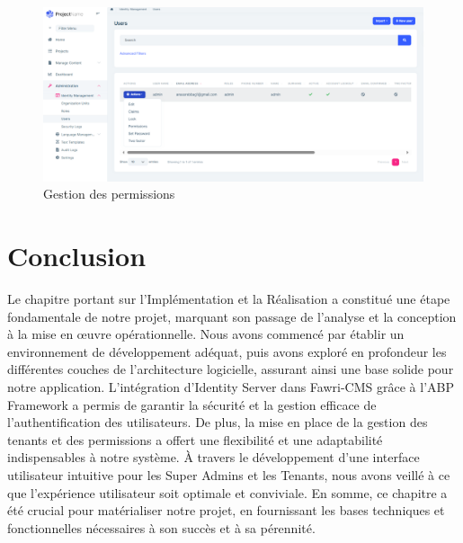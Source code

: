 \begin{enumerate}
          \begin{figure}[H]
              \centering
              \includegraphics[width=17cm]{Figures/permission.PNG}
              \caption{Gestion des permissions}
          \end{figure}





\end{enumerate}



















\newpage

\section*{Conclusion}

\hspace{\parindent}Le chapitre portant sur l'Implémentation et la Réalisation a constitué une étape fondamentale de notre projet, marquant son passage de l’analyse et la conception à la mise en œuvre opérationnelle. Nous avons commencé par établir un environnement de développement adéquat, puis avons exploré en profondeur les différentes couches de l'architecture logicielle, assurant ainsi une base solide pour notre application. L'intégration d'Identity Server dans Fawri-CMS grâce à l'ABP Framework a permis de garantir la sécurité et la gestion efficace de l'authentification des utilisateurs. De plus, la mise en place de la gestion des tenants et des permissions a offert une flexibilité et une adaptabilité indispensables à notre système. À travers le développement d'une interface utilisateur intuitive pour les Super Admins et les Tenants, nous avons veillé à ce que l'expérience utilisateur soit optimale et conviviale. En somme, ce chapitre a été crucial pour matérialiser notre projet, en fournissant les bases techniques et fonctionnelles nécessaires à son succès et à sa pérennité.

\pagebreak
